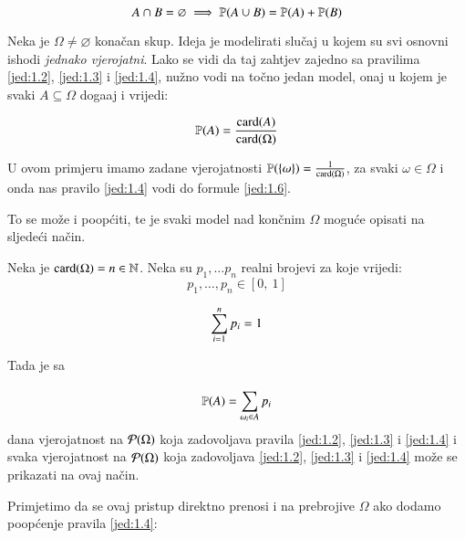 \begin{equation} \label{jed:1.4}
    A \cap B = \varnothing \implies \mathbb{P}({A \cup B}) = \mathbb{P}({A}) + \mathbb{P}({B})
\end{equation}

\begin{pr} \label{pr:1.5}
    Neka je $\Omega \neq \varnothing$ kona\v can skup.
    Ideja je modelirati slu\v caj u kojem su svi osnovni ishodi \emph{jednako vjerojatni}.
    Lako se vidi da taj zahtjev zajedno sa pravilima \eqref{jed:1.2}, \eqref{jed:1.3} i \eqref{jed:1.4}, nu\v zno vodi na to\v cno jedan model, onaj u kojem je svaki $A \subseteq \Omega$ doga\dj aj i vrijedi:

    \begin{equation} \label{jed:1.6}
        \mathbb{P}({A}) = \frac{\textnormal{card}({A})}{\textnormal{card}({\Omega})}
    \end{equation}
\end{pr}

U ovom primjeru imamo zadane vjerojatnosti $\mathbb{P}({\{ \omega\}}) = \frac{1}{\textnormal{card}({\Omega})}$, za svaki $\omega \in \Omega$ i onda nas pravilo \eqref{jed:1.4} vodi do formule \eqref{jed:1.6}.

To se mo\v ze i poop\' citi, te je svaki model nad kon\v cnim $\Omega$ mogu\' ce opisati na sljede\' ci na\v cin.

\begin{pr} \label{pr:1.7}
    Neka je $\textnormal{card}({\Omega}) = n \in \mathbb{N}$.
    Neka su $p_1, \dots p_n$ realni brojevi za koje vrijedi:
    \begin{equation}    \label{jed:1.8}
        p_1, \dots, p_n \in [0, \: 1]
    \end{equation}

    \begin{equation}    \label{jed:1.9}
        \sum\limits_{i = 1}^{n} p_i = 1
    \end{equation}

    Tada je sa

    \begin{equation} \label{jed:1.10}
        \mathbb{P}({A}) = \sum\limits_{\omega_i \in A}^{} p_i
    \end{equation}
    dana vjerojatnost na $\mathcal{P}({\Omega})$ koja zadovoljava pravila \eqref{jed:1.2}, \eqref{jed:1.3} i \eqref{jed:1.4} i svaka vjerojatnost na $\mathcal{P}({\Omega})$ koja zadovoljava \eqref{jed:1.2}, \eqref{jed:1.3} i \eqref{jed:1.4} mo\v ze se prikazati na ovaj na\v cin.
\end{pr}

Primjetimo da se ovaj pristup direktno prenosi i na prebrojive $\Omega$ ako dodamo poop\' cenje pravila \eqref{jed:1.4}:


